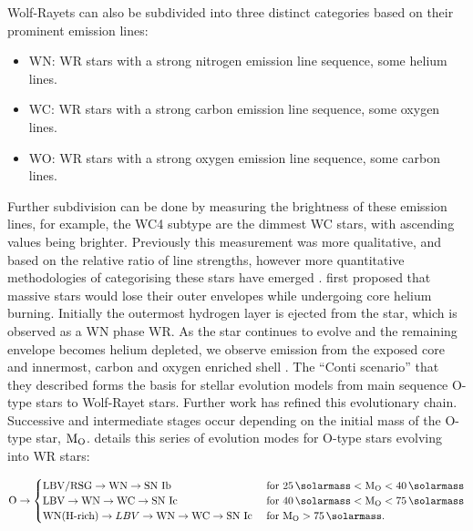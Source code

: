 Wolf-Rayets can also be subdivided into three distinct categories based on their prominent emission lines:

\begin{itemize}
  \item WN: WR stars with a strong nitrogen emission line sequence, some helium lines.
  \item WC: WR stars with a strong carbon emission line sequence, some oxygen lines.
  \item WO: WR stars with a strong oxygen emission line sequence, some carbon lines.
\end{itemize}

\noindent
Further subdivision can be done by measuring the brightness of these emission lines, for example, the WC4 subtype are the dimmest WC stars, with ascending values being brighter.
Previously this measurement was more qualitative, and based on the relative ratio of line strengths, however more quantitative methodologies of categorising these stars have emerged
\parencite{crowtherQuantitativeClassificationWC1998}.
\textcite{contiRelationshipWRStars1975} first proposed that massive stars would lose their outer envelopes while undergoing core helium burning.
Initially the outermost hydrogen layer is ejected from the star, which is observed as a WN phase WR.
As the star continues to evolve and the remaining envelope becomes helium depleted, we observe emission from the exposed core and innermost, carbon and oxygen enriched shell
.
The ``Conti scenario'' that they described forms the basis for stellar evolution models from main sequence O-type stars to Wolf-Rayet stars.
Further work has refined this evolutionary chain.
Successive and intermediate stages occur depending on the initial mass of the O-type star, $\text{M}_\text{O}$.
\textcite{crowther_physical_2007} details this series of evolution modes for O-type stars evolving into WR stars:

\begin{equation}
  \label{eq:wrevolution}
  \text{O} \rightarrow
  \begin{cases}
    \text{LBV/RSG} \rightarrow \text{WN} \rightarrow \text{SN Ib} & \text{ for } \SI{25}{\solarmass} < \mass\rms{O} < \SI{40}{\solarmass} \\
    \text{LBV} \rightarrow \text{WN} \rightarrow \text{WC} \rightarrow \text{SN Ic} & \text{ for } \SI{40}{\solarmass} < \mass\rms{O} < \SI{75}{\solarmass} \\ 
    \text{WN(H-rich)} \rightarrow LBV \rightarrow \text{WN} \rightarrow \text{WC} \rightarrow \text{SN Ic} & \text{ for } \mass\rms{O} > \SI{75}{\solarmass} .
  \end{cases}
\end{equation}

